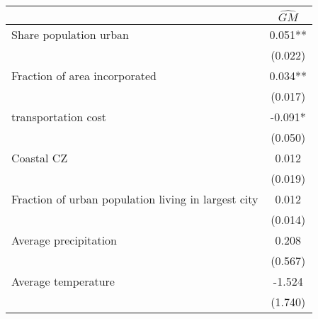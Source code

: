  \begin{tabular}{l*{1}{c}} \toprule
                &\multicolumn{1}{c}{$\widehat{GM}$}\\
\midrule
Share population urban&    0.051** \\
                &  (0.022)   \\
\addlinespace
Fraction of area incorporated&    0.034** \\
                &  (0.017)   \\
\addlinespace
1920 transportation cost&   -0.091*  \\
                &  (0.050)   \\
\addlinespace
Coastal CZ      &    0.012   \\
                &  (0.019)   \\
\addlinespace
Fraction of urban population living in largest city&    0.012   \\
                &  (0.014)   \\
\addlinespace
Average precipitation&    0.208   \\
                &  (0.567)   \\
\addlinespace
Average temperature&   -1.524   \\
                &  (1.740)   \\
       \bottomrule \end{tabular}
